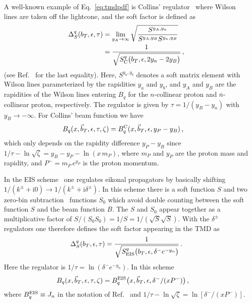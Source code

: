 \documentclass[prd,aps,twocolumn,bibnotes,nofootinbib,preprintnumbers,floatfix]{revtex4-1}
\DeclareRobustCommand{\eq}[1]{Eq.~\eqref{eq:#1}}
\DeclareRobustCommand{\mycite}[1]{Ref.~\cite{#1}}
\newcommand{\img}{\mathrm{i}}
\newcommand{\eps}{\epsilon}
\newcommand{\nn}{\nonumber}
\newcommand{\bn}{{\bar{n}}}
\newcommand{\bt}{\vec b_T}
\begin{document}
A well-known example of \eq{tmdpdf} is Collins' regulator~\cite{Collins:1350496} where Wilson lines are taken off the lightcone, and the soft factor is defined as
\begin{align}
 \Delta_S^q(b_T,\epsilon,\tau) &
  = \lim_{y_A\to \infty} \sqrt{\frac{S^{y_A,y_n}}{S^{y_A,y_B}S^{y_n,y_B}}}
 \nn\\&
  = \frac{1}{\sqrt{S^q_{\rm C}\bigl(b_T,\epsilon,2y_n-2y_B\bigr)}}
\,,\end{align}
(see \mycite{Buffing:2017mqm} for the last equality).
Here, $S^{y_a,y_b}$ denotes a soft matrix element with Wilson lines parameterized by the rapidities $y_a$ and $y_b$,
and $y_A$ and $y_B$ are the rapidities of the Wilson lines entering $B_q$ for the $n$-collinear proton and $\bn$-collinear proton, respectively.
The regulator is given by $\tau =1/(y_B-y_n)$ with $y_B\to - \infty$.
For Collins' beam function we have
\begin{align}
B_q(x,\bt,\epsilon,\tau,\zeta) &= B_q^{\rm C}(x,\bt,\epsilon,y_P-y_B) \,,
\end{align}
which only depends on the rapidity difference $y_P-y_B$ since $1/\tau - \ln\sqrt{\zeta} = y_B-y_P -\ln (x\,m_P)$, where $m_P$ and $y_P$ are the proton mass and rapidity, and $P^-=m_P\, e^{y_P}$ is the proton momentum.

In the EIS scheme~\cite{GarciaEchevarria:2011rb,Echevarria:2012js} one regulates eikonal propagators by basically shifting $1/(k^\pm + \img0) \to 1/(k^\pm + \img \delta^\pm)$. In this scheme there is a soft function $S$ and two zero-bin subtraction~\cite{Manohar:2006nz} functions $S_0$ which avoid double counting between the soft function $S$ and the beam function $B$. The $S$ and $S_0$ appear together as a multiplicative factor of $S/(S_0 S_0)=1/S=1/(\sqrt{S}\sqrt{S})$. With the $\delta^\pm$ regulators one therefore defines the soft factor appearing in the TMD as
\begin{align}
 \Delta_S^q(b_T,\eps,\tau) = \frac{1}{\sqrt{S^q_{\rm EIS}\bigl(b_T, \eps, \delta^- e^{-y_n}\bigr)}}
\,.\end{align}
Here the regulator is $1/\tau = \ln(\delta^- e^{-y_n})$. In this scheme 
\begin{align}
  B_q(x,\bt,\epsilon,\tau,\zeta) &= B_q^{\rm EIS} \bigl(x,\bt,\epsilon, \delta^-/( x P^-) \bigr) \,,
\end{align}
where $B_q^{\rm EIS} \equiv J_n$ in the notation of \mycite{Echevarria:2012js} and $1/\tau -\ln\sqrt{\zeta} = \ln[ \delta^-/(x P^-)]$.
\end{document}
